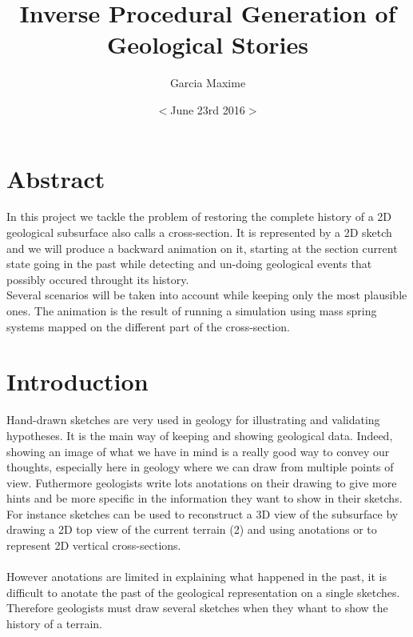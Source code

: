 \documentclass[12pt, a4paper]{memoir} %
\title{ Inverse Procedural Generation of Geological Stories}%
\author{Garcia Maxime}
\date{ $<$June 23rd 2016$>$} %
\begin{document}
\frontmatter
\begin{titlingpage}
\maketitle
\end{titlingpage}

\section{Abstract}

In this project we tackle the problem of restoring the complete history of a 2D geological 
subsurface also calls a cross-section. It is represented by a 2D sketch and we will produce a backward animation on it, starting
at the section current state going in the past while detecting and un-doing geological events
that possibly occured throught its history. \\
Several scenarios will be taken into account while keeping only the most plausible ones. The animation is the result of running a simulation using mass spring systems mapped on the different part of the cross-section.

\section{Introduction}

Hand-drawn sketches are very used in geology for illustrating and validating hypotheses. It is the main way of keeping and showing geological data. Indeed, showing an image of what we have in mind is a really good way to convey our thoughts, especially here in geology where we can draw from multiple points of view. Futhermore geologists write lots anotations on their drawing to give more hints and be more specific in the information they want to show in their sketchs. 
For instance sketches can be used to reconstruct a 3D view of the subsurface by drawing a 2D top view of the current terrain (2) and using anotations or to represent 2D vertical cross-sections. \\\\

However anotations are limited in explaining what happened in the past, it is difficult to anotate the past of the geological representation on a single sketches. Therefore geologists must draw several sketches when they whant to show the history of a terrain. \\\\
\end{document}
